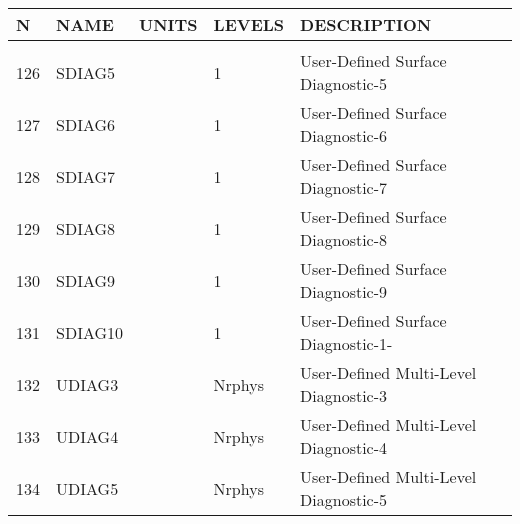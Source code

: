\newpage
\vspace*{\fill}
\begin{tabular}{lllll}
\hline\hline
N & NAME & UNITS & LEVELS & DESCRIPTION \\
\hline

&\\
126& SDIAG5   &             &    1  
         &\begin{minipage}[t]{3in}
          {User-Defined Surface Diagnostic-5} 
         \end{minipage}\\
127& SDIAG6   &             &    1  
         &\begin{minipage}[t]{3in}
          {User-Defined Surface Diagnostic-6} 
         \end{minipage}\\
128& SDIAG7   &             &    1  
         &\begin{minipage}[t]{3in}
          {User-Defined Surface Diagnostic-7} 
         \end{minipage}\\
129& SDIAG8   &             &    1  
         &\begin{minipage}[t]{3in}
          {User-Defined Surface Diagnostic-8} 
         \end{minipage}\\
130& SDIAG9   &             &    1  
         &\begin{minipage}[t]{3in}
          {User-Defined Surface Diagnostic-9} 
         \end{minipage}\\
131& SDIAG10  &             &    1  
         &\begin{minipage}[t]{3in}
          {User-Defined Surface Diagnostic-1-} 
         \end{minipage}\\
132& UDIAG3   &             &    Nrphys  
         &\begin{minipage}[t]{3in}
          {User-Defined Multi-Level Diagnostic-3} 
         \end{minipage}\\
133& UDIAG4   &             &    Nrphys  
         &\begin{minipage}[t]{3in}
          {User-Defined Multi-Level Diagnostic-4} 
         \end{minipage}\\
134& UDIAG5   &             &    Nrphys  
         &\begin{minipage}[t]{3in}
          {User-Defined Multi-Level Diagnostic-5} 

\end{minipage}
\end{tabular}

